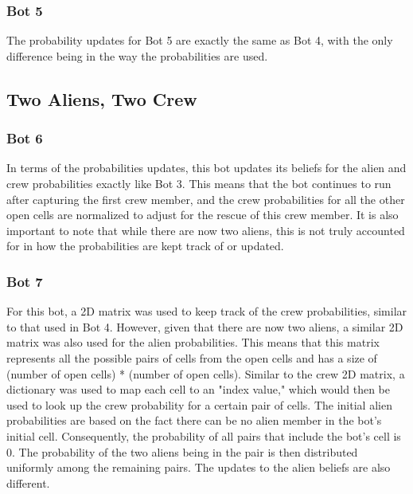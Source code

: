 \documentclass[11pt]{article}
\begin{document}
\subsubsection{Bot 5}

The probability updates for Bot 5 are exactly the same as Bot 4, with the only difference being in the way the probabilities are used.

\subsection{Two Aliens, Two Crew}

\subsubsection{Bot 6}
In terms of the probabilities updates, this bot updates its beliefs for the alien and crew probabilities exactly like Bot 3. This means that the bot continues to run after capturing the first crew member, and the crew probabilities for all the other open cells are normalized to adjust for the rescue of this crew member. It is also important to note that while there are now two aliens, this is not truly accounted for in how the probabilities are kept track of or updated. 
\subsubsection{Bot 7}
For this bot, a 2D matrix was used to keep track of the crew probabilities, similar to that used in Bot 4. However, given that there are now two aliens, a similar 2D matrix was also used for the alien probabilities. This means that this matrix represents all the possible pairs of cells from the open cells and has a size of (number of open cells) * (number of open cells). Similar to the crew 2D matrix, a dictionary was used to map each cell to an "index value," which would then be used to look up the crew probability for a certain pair of cells. The initial alien probabilities are based on the fact there can be no alien member in the bot's initial cell. Consequently, the probability of all pairs that include the bot's cell is 0. The probability of the two aliens being in the pair is then distributed uniformly among the remaining pairs. The updates to the alien beliefs are also different.
\medskip
\end{document}
